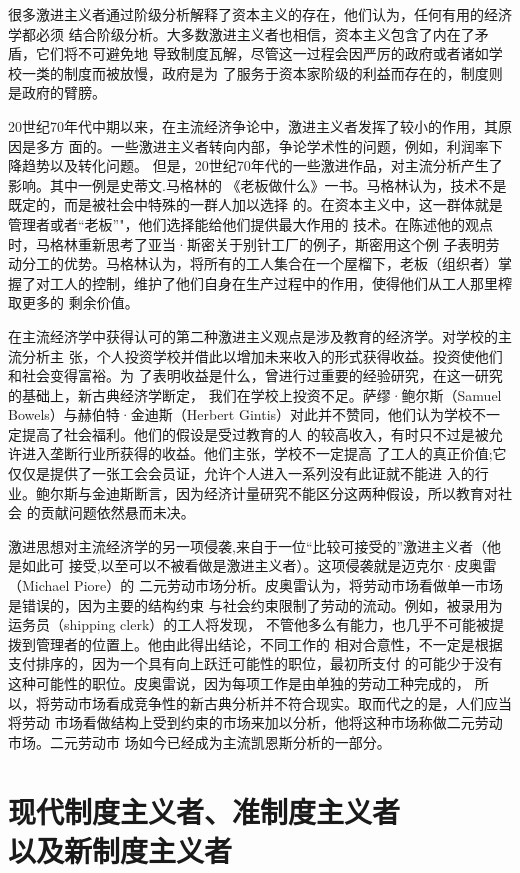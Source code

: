 很多激进主义者通过阶级分析解释了资本主义的存在，他们认为，任何有用的经济学都必须
结合阶级分析。大多数激进主义者也相信，资本主义包含了内在了矛盾，它们将不可避免地
导致制度瓦解，尽管这一过程会因严厉的政府或者诸如学校一类的制度而被放慢，政府是为
了服务于资本家阶级的利益而存在的，制度则是政府的臂膀。

20世纪70年代中期以来，在主流经济争论中，激进主义者发挥了较小的作用，其原因是多方
面的。一些激进主义者转向内部，争论学术性的问题，例如，利润率下降趋势以及转化问题。
但是，20世纪70年代的一些激进作品，对主流分析产生了影响。其中一例是史蒂文.马格林的
《老板做什么》一书。马格林认为，技术不是既定的，而是被社会中特殊的一群人加以选择
的。在资本主义中，这一群体就是管理者或者“老板”"，他们选择能给他们提供最大作用的
技术。在陈述他的观点时，马格林重新思考了亚当·斯密关于别针工厂的例子，斯密用这个例
子表明劳动分工的优势。马格林认为，将所有的工人集合在一个屋榴下，老板（组织者）掌
握了对工人的控制，维护了他们自身在生产过程中的作用，使得他们从工人那里榨取更多的
剩余价值。

在主流经济学中获得认可的第二种激进主义观点是涉及教育的经济学。对学校的主流分析主
张，个人投资学校并借此以增加未来收入的形式获得收益。投资使他们和社会变得富裕。为
了表明收益是什么，曾进行过重要的经验研究，在这一研究的基础上，新古典经济学断定，
我们在学校上投资不足。萨缪·鲍尔斯（Samuel Bowels）与赫伯特·金迪斯（Herbert
Gintis）对此并不赞同，他们认为学校不一定提高了社会福利。他们的假设是受过教育的人
的较高收入，有时只不过是被允许进入垄断行业所获得的收益。他们主张，学校不一定提高
了工人的真正价值;它仅仅是提供了一张工会会员证，允许个人进入一系列没有此证就不能进
入的行业。鲍尔斯与金迪斯断言，因为经济计量研究不能区分这两种假设，所以教育对社会
的贡献问题依然悬而未决。

激进思想对主流经济学的另一项侵袭,来自于一位“比较可接受的”激进主义者（他是如此可
接受,以至可以不被看做是激进主义者）。这项侵袭就是迈克尔·皮奥雷（Michael Piore）的
二元劳动市场分析。皮奥雷认为，将劳动市场看做单一市场是错误的，因为主要的结构约束
与社会约束限制了劳动的流动。例如，被录用为运务员（shipping clerk）的工人将发现，
不管他多么有能力，也几乎不可能被提拨到管理者的位置上。他由此得出结论，不同工作的
相对合意性，不一定是根据支付排序的，因为一个具有向上跃迁可能性的职位，最初所支付
的可能少于没有这种可能性的职位。皮奥雷说，因为每项工作是由单独的劳动工种完成的，
所以，将劳动市场看成竞争性的新古典分析并不符合现实。取而代之的是，人们应当将劳动
市场看做结构上受到约束的市场来加以分析，他将这种市场称做二元劳动市场。二元劳动市
场如今已经成为主流凯恩斯分析的一部分。

\section{现代制度主义者、准制度主义者\\以及新制度主义者}

